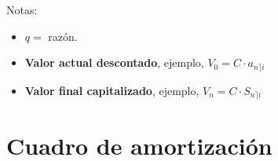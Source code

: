 \documentclass[10pt, a4paper]{article}
\begin{document}
\vspace*{0.5cm}

Notas:

\begin{itemize}[leftmargin=*]
	\item[] $q =$ razón.
	\item[] \textbf{Valor actual descontado}, ejemplo, $V_{0} = C \cdot a_{n \rceil i}$
	\item[] \textbf{Valor final capitalizado}, ejemplo, $V_{n} = C \cdot S_{n \rceil i}$
\end{itemize}

\newpage

\section*{Cuadro de amortización}
\end{document}
